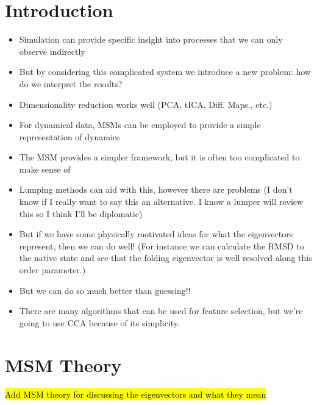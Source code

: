 \documentclass[onecolumn,floatfix,nofootinbib,aps,notitlepage]{revtex4-1}
\begin{document}
\section{Introduction}
\begin{itemize}
\item Simulation can provide specific insight into processes that we can only observe indirectly
\item But by considering this complicated system we introduce a new problem: how do we interpret the results?
\item Dimensionality reduction works well (PCA, tICA, Diff. Maps., etc.)
\item For dynamical data, MSMs can be employed to provide a simple representation of dynamics
\item The MSM provides a simpler framework, but it is often too complicated to make sense of
\item Lumping methods can aid with this, however there are problems (I don't know if I really want to say this an alternative. I know a lumper will review this so I think I'll be diplomatic)
\item But if we have some physically motivated ideas for what the eigenvectors represent, then we can do well! (For instance we can calculate the RMSD to the native state and see that the folding eigenvector is well resolved along this order parameter.)
\item But we can do so much better than guessing!!
\item There are many algorithms that can be used for feature selection, but we're going to use CCA because of its simplicity.
\end{itemize}

\section{MSM Theory}
\hl{Add MSM theory for discussing the eigenvectors and what they mean}
\end{document}
